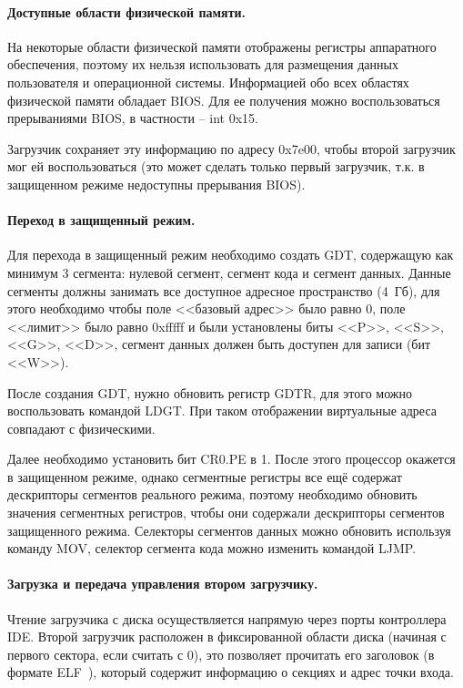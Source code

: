 \paragraph{Доступные области физической памяти.} На некоторые области физической памяти
отображены регистры аппаратного обеспечения, поэтому их нельзя использовать для размещения
данных пользователя и операционной системы. Информацией обо всех областях физической памяти
обладает BIOS. Для ее получения можно воспользоваться прерываниями BIOS, в частности -- int 0x15.

Загрузчик сохраняет эту информацию по адресу 0x7e00, чтобы второй загрузчик мог ей воспользоваться
(это может сделать только первый загрузчик, т.к. в защищенном режиме недоступны прерывания BIOS).

\paragraph{Переход в защищенный режим.} Для перехода в защищенный режим необходимо создать GDT,
содержащую как минимум 3 сегмента: нулевой сегмент, сегмент кода и сегмент данных. Данные сегменты
должны занимать все доступное адресное пространство (4~Гб), для этого необходимо чтобы поле
<<базовый адрес>> было равно 0, поле <<лимит>> было равно 0xfffff и были установлены биты
<<P>>, <<S>>, <<G>>, <<D>>, сегмент данных должен быть доступен для записи (бит <<W>>).

После создания GDT, нужно обновить регистр GDTR, для этого можно воспользовать командой LDGT.
При таком отображении виртуальные адреса совпадают с физическими.

Далее необходимо установить бит CR0.PE в 1. После этого процессор окажется в защищенном режиме,
однако сегментные регистры все ещё содержат дескрипторы сегментов реального режима, поэтому необходимо
обновить значения сегментных регистров, чтобы они содержали дескрипторы сегментов защищенного
режима. Селекторы сегментов данных можно обновить используя команду MOV, селектор сегмента кода
можно изменить командой LJMP.

\paragraph{Загрузка и передача управления втором загрузчику.} Чтение загрузчика с диска
осуществляется напрямую через порты контроллера IDE. Второй загрузчик расположен в фиксированной
области диска (начиная с первого сектора, если считать с 0), это позволяет прочитать его заголовок
(в формате ELF~\cite{elf}), который содержит информацию о секциях и адрес точки входа.

